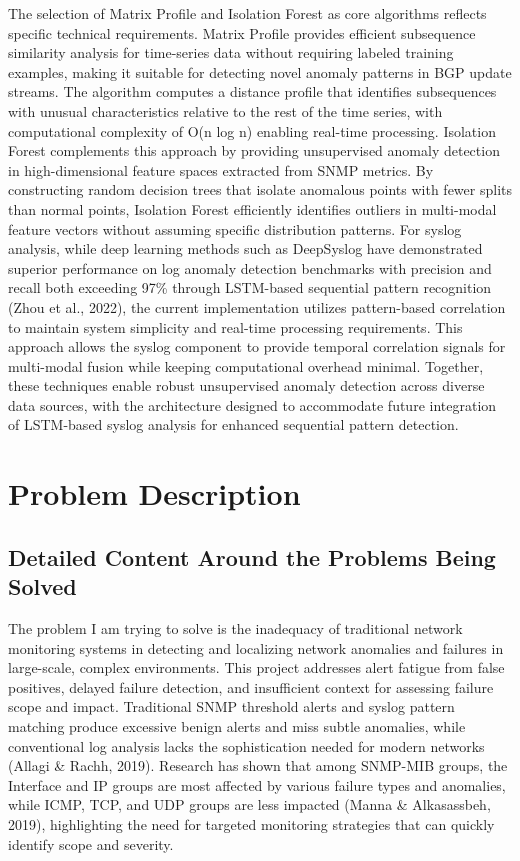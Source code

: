 \documentclass[11pt]{article}
\begin{document}
The selection of Matrix Profile and Isolation Forest as core algorithms reflects specific technical requirements. Matrix Profile provides efficient subsequence similarity analysis for time-series data without requiring labeled training examples, making it suitable for detecting novel anomaly patterns in BGP update streams. The algorithm computes a distance profile that identifies subsequences with unusual characteristics relative to the rest of the time series, with computational complexity of O(n log n) enabling real-time processing. Isolation Forest complements this approach by providing unsupervised anomaly detection in high-dimensional feature spaces extracted from SNMP metrics. By constructing random decision trees that isolate anomalous points with fewer splits than normal points, Isolation Forest efficiently identifies outliers in multi-modal feature vectors without assuming specific distribution patterns. For syslog analysis, while deep learning methods such as DeepSyslog have demonstrated superior performance on log anomaly detection benchmarks with precision and recall both exceeding 97\% through LSTM-based sequential pattern recognition (Zhou et al., 2022), the current implementation utilizes pattern-based correlation to maintain system simplicity and real-time processing requirements. This approach allows the syslog component to provide temporal correlation signals for multi-modal fusion while keeping computational overhead minimal. Together, these techniques enable robust unsupervised anomaly detection across diverse data sources, with the architecture designed to accommodate future integration of LSTM-based syslog analysis for enhanced sequential pattern detection.

\section{Problem Description}

\subsection{Detailed Content Around the Problems Being Solved}

The problem I am trying to solve is the inadequacy of traditional network monitoring systems in detecting and localizing network anomalies and failures in large-scale, complex environments. This project addresses alert fatigue from false positives, delayed failure detection, and insufficient context for assessing failure scope and impact. Traditional SNMP threshold alerts and syslog pattern matching produce excessive benign alerts and miss subtle anomalies, while conventional log analysis lacks the sophistication needed for modern networks (Allagi \& Rachh, 2019). Research has shown that among SNMP-MIB groups, the Interface and IP groups are most affected by various failure types and anomalies, while ICMP, TCP, and UDP groups are less impacted (Manna \& Alkasassbeh, 2019), highlighting the need for targeted monitoring strategies that can quickly identify scope and severity.
\end{document}
